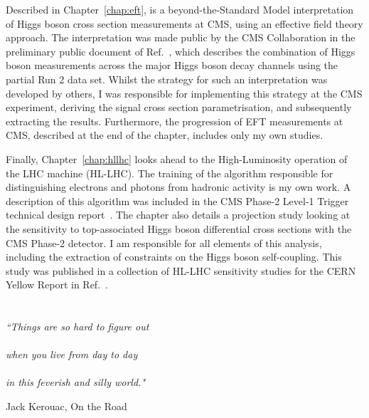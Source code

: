 Described in Chapter~\ref{chap:eft}, is a beyond-the-Standard Model interpretation of Higgs boson cross section measurements at CMS, using an effective field theory approach. The interpretation was made public by the CMS Collaboration in the preliminary public document of Ref.~\cite{CMS-PAS-HIG-19-005}, which describes the combination of Higgs boson measurements across the major Higgs boson decay channels using the partial Run 2 data set. Whilst the strategy for such an interpretation was developed by others, I was responsible for implementing this strategy at the CMS experiment, deriving the signal cross section parametrisation, and subsequently extracting  the results. Furthermore, the progression of EFT measurements at CMS, described at the end of the chapter, includes only my own studies.

Finally, Chapter~\ref{chap:hllhc} looks ahead to the High-Luminosity operation of the LHC machine (HL-LHC). The training of the algorithm responsible for distinguishing electrons and photons from hadronic activity is my own work. A description of this algorithm was included in the CMS Phase-2 Level-1 Trigger technical design report~\cite{CERN-LHCC-2020-004}. The chapter also details a projection study looking at the sensitivity to top-associated Higgs boson differential cross sections with the CMS Phase-2 detector. I am responsible for all elements of this analysis, including the extraction of constraints on the Higgs boson self-coupling. This study was published in a collection of HL-LHC sensitivity studies for the CERN Yellow Report in Ref.~\cite{Cepeda:2019klc}.

\chapter*{}
\epigraph{
  \textit{``Things are so hard to figure out \\ \\
            when you live from day to day \\ \\
            in this feverish and silly world."}}
          {Jack Kerouac, On the Road}
\cleardoublepage

